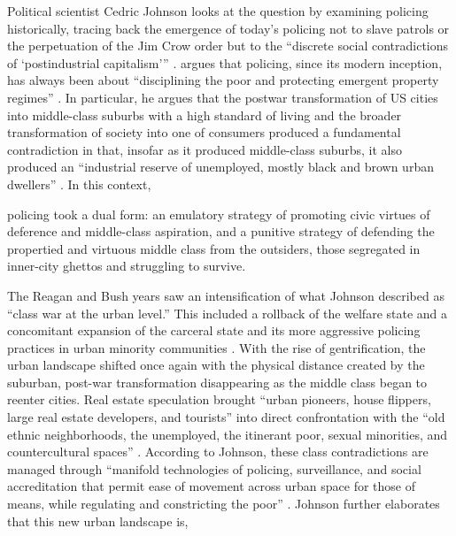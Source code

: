 \documentclass[12pt]{article}
\renewenvironment{quote}
  {\list{}{\leftmargin=\parindent\rightmargin=0pt}%
   \item\relax}
  {\endlist}
\begin{document}
Political scientist Cedric Johnson looks at the question by examining policing historically, tracing back the emergence of today’s policing not to slave patrols or the perpetuation of the Jim Crow order but to the “discrete social contradictions of ‘postindustrial capitalism’” \parencite*[171]{johnsonTrumpismPolicingProblem2019}. \citeauthor{johnsonTrumpismPolicingProblem2019} argues that policing, since its modern inception, has always been about “disciplining the poor and protecting emergent property regimes” \parencite*[172]{johnsonTrumpismPolicingProblem2019}. In particular, he argues that the postwar transformation of US cities into middle-class suburbs with a high standard of living and the broader transformation of society into one of consumers produced a fundamental contradiction in that, insofar as it produced middle-class suburbs, it also produced an “industrial reserve of unemployed, mostly black and brown urban dwellers” \parencite*[171]{johnsonTrumpismPolicingProblem2019}. In this context,

\begin{quote}
policing took a dual form: an emulatory strategy of promoting civic virtues of deference and middle-class aspiration, and a punitive strategy of defending the propertied and virtuous middle class from the outsiders, those segregated in inner-city ghettos and struggling to survive. \parencite[176]{johnsonTrumpismPolicingProblem2019}
\end{quote}

The Reagan and Bush years saw an intensification of what Johnson described as “class war at the urban level.” This included a rollback of the welfare state and a concomitant expansion of the carceral state and its more aggressive policing practices in urban minority communities \parencites[177]{johnsonTrumpismPolicingProblem2019}{johnsonBlackLivesMatter2023}. With the rise of gentrification, the urban landscape shifted once again with the physical distance created by the suburban, post-war transformation disappearing as the middle class began to reenter cities. Real estate speculation brought “urban pioneers, house flippers, large real estate developers, and tourists” into direct confrontation with the “old ethnic neighborhoods, the unemployed, the itinerant poor, sexual minorities, and countercultural spaces” \parencite[177]{johnsonTrumpismPolicingProblem2019}. According to Johnson, these class contradictions are managed through “manifold technologies of policing, surveillance, and social accreditation that permit ease of movement across urban space for those of means, while regulating and constricting the poor” \parencite*[178]{johnsonTrumpismPolicingProblem2019}. Johnson further elaborates that this new urban landscape is,
\end{document}
